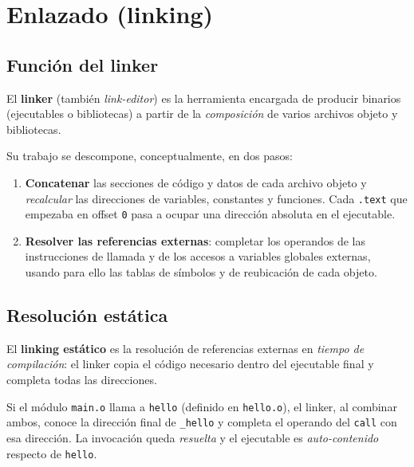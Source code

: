 \documentclass[11pt,a4paper]{article}
\begin{document}
\section{Enlazado (linking)}

\subsection{Función del linker}

\begin{definicion}
El \textbf{linker} (también \emph{link-editor}) es la herramienta
encargada de producir binarios (ejecutables o bibliotecas) a partir de
la \emph{composición} de varios archivos objeto y bibliotecas.
\end{definicion}

Su trabajo se descompone, conceptualmente, en dos pasos:

\begin{enumerate}[leftmargin=*]
    \item \textbf{Concatenar} las secciones de código y datos de cada
        archivo objeto y \emph{recalcular} las direcciones de
        variables, constantes y funciones. Cada \texttt{.text} que
        empezaba en offset \texttt{0} pasa a ocupar una dirección
        absoluta en el ejecutable.
    \item \textbf{Resolver las referencias externas}: completar los
        operandos de las instrucciones de llamada y de los accesos a
        variables globales externas, usando para ello las tablas de
        símbolos y de reubicación de cada objeto.
\end{enumerate}

\subsection{Resolución estática}

\begin{definicion}
El \textbf{linking estático} es la resolución de referencias externas
en \emph{tiempo de compilación}: el linker copia el código necesario
dentro del ejecutable final y completa todas las direcciones.
\end{definicion}

Si el módulo \texttt{main.o} llama a \texttt{hello} (definido en
\texttt{hello.o}), el linker, al combinar ambos, conoce la dirección
final de \texttt{\_hello} y completa el operando del \texttt{call}
con esa dirección. La invocación queda \emph{resuelta} y el
ejecutable es \emph{auto-contenido} respecto de \texttt{hello}.
\end{document}

